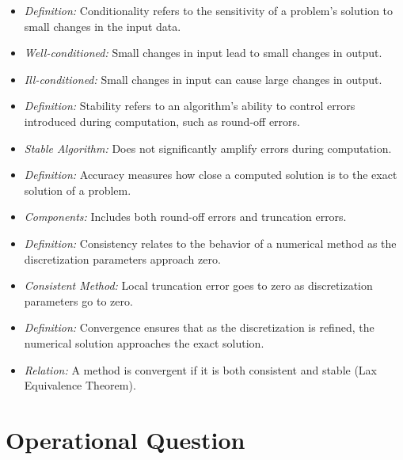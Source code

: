 \begin{itemize}
    \item \textit{Definition:} Conditionality refers to the sensitivity of a problem's solution to small changes in the input data.
    \item \textit{Well-conditioned:} Small changes in input lead to small changes in output.
    \item \textit{Ill-conditioned:} Small changes in input can cause large changes in output.
\end{itemize}


\begin{itemize}
    \item \textit{Definition:} Stability refers to an algorithm's ability to control errors introduced during computation, such as round-off errors.
    \item \textit{Stable Algorithm:} Does not significantly amplify errors during computation.
\end{itemize}


\begin{itemize}
    \item \textit{Definition:} Accuracy measures how close a computed solution is to the exact solution of a problem.
    \item \textit{Components:} Includes both round-off errors and truncation errors.
\end{itemize}


\begin{itemize}
    \item \textit{Definition:} Consistency relates to the behavior of a numerical method as the discretization parameters approach zero.
    \item \textit{Consistent Method:} Local truncation error goes to zero as discretization parameters go to zero.
\end{itemize}


\begin{itemize}
    \item \textit{Definition:} Convergence ensures that as the discretization is refined, the numerical solution approaches the exact solution.
    \item \textit{Relation:} A method is convergent if it is both consistent and stable (Lax Equivalence Theorem).
\end{itemize}

\section{Operational Question}


